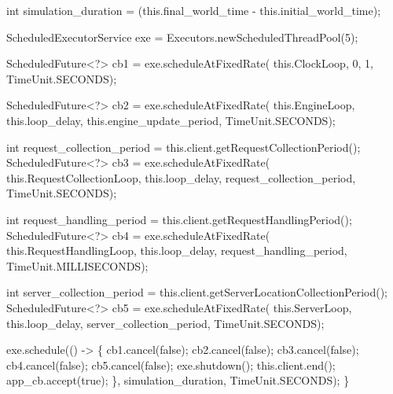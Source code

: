  int simulation_duration = (this.final_world_time - this.initial_world_time);

  ScheduledExecutorService exe = Executors.newScheduledThreadPool(5);

  ScheduledFuture<?> cb1 = exe.scheduleAtFixedRate(
    this.ClockLoop, 0, 1, TimeUnit.SECONDS);

  ScheduledFuture<?> cb2 = exe.scheduleAtFixedRate(
    this.EngineLoop, this.loop_delay, this.engine_update_period, TimeUnit.SECONDS);

  int request_collection_period = this.client.getRequestCollectionPeriod();
  ScheduledFuture<?> cb3 = exe.scheduleAtFixedRate(
    this.RequestCollectionLoop, this.loop_delay, request_collection_period, TimeUnit.SECONDS);

  int request_handling_period = this.client.getRequestHandlingPeriod();
  ScheduledFuture<?> cb4 = exe.scheduleAtFixedRate(
    this.RequestHandlingLoop, this.loop_delay, request_handling_period, TimeUnit.MILLISECONDS);

  int server_collection_period = this.client.getServerLocationCollectionPeriod();
  ScheduledFuture<?> cb5 = exe.scheduleAtFixedRate(
    this.ServerLoop, this.loop_delay, server_collection_period, TimeUnit.SECONDS);

  exe.schedule(() -> \{
    cb1.cancel(false);
    cb2.cancel(false);
    cb3.cancel(false);
    cb4.cancel(false);
    cb5.cancel(false);
    exe.shutdown();
    this.client.end();
    app_cb.accept(true);
  \}, simulation_duration, TimeUnit.SECONDS);
\}
\eatline
{}\nwendcode{}\nwdocspar
